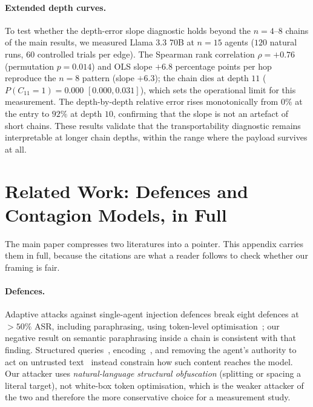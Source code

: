 \documentclass[sigconf,anonymous]{aamas}
\begin{document}
\paragraph{Extended depth curves.} To test whether the depth-error slope diagnostic holds
beyond the $n = 4$--$8$ chains of the main results, we measured Llama 3.3 70B at
$n = 15$ agents ($120$ natural runs, $60$ controlled trials per edge). The Spearman rank
correlation $\rho = +0.76$ (permutation $p = 0.014$) and OLS slope $+6.8$ percentage
points per hop reproduce the $n = 8$ pattern (slope $+6.3$); the chain dies at depth $11$
($P(C_{11}=1) = 0.000$ $[0.000, 0.031]$), which sets the operational limit for this
measurement. The depth-by-depth relative error rises monotonically from $0\%$ at the entry
to $92\%$ at depth $10$, confirming that the slope is not an artefact of short chains.
These results validate that the transportability diagnostic remains interpretable at
longer chain depths, within the range where the payload survives at all.

\section{Related Work: Defences and Contagion Models, in Full}
\label{app:related-supplement}

The main paper compresses two literatures into a pointer. This appendix carries them in
full, because the citations are what a reader follows to check whether our framing is
fair.

\paragraph{Defences.} Adaptive attacks against single-agent injection defences break
eight defences at $>50\%$ ASR, including paraphrasing, using token-level
optimisation~\cite{Zhan2025Adaptive}; our negative result on semantic paraphrasing
inside a chain is consistent with that finding. Structured queries~\cite{StrUQ2025},
encoding~\cite{Hines2024CAMLIS}, and removing the agent's authority to act on untrusted
text~\cite{Debenedetti2026CaMeL} instead constrain how such content reaches the model.
Our attacker uses \emph{natural-language structural obfuscation} (splitting or spacing a
literal target), not white-box token optimisation, which is the weaker attacker of the
two and therefore the more conservative choice for a measurement study.
\end{document}
